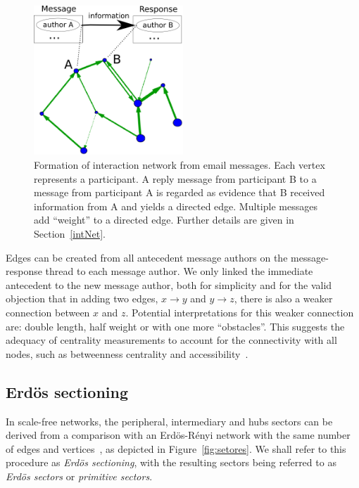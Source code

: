 \documentclass[%
 aip,
 jmp,%
 amsmath,amssymb,
 reprint,%
]{revtex4-1}
\begin{document}
\begin{figure}[!h]
    \centering
    \includegraphics[width=0.5\textwidth]{figs/criaRede_}
    \caption{Formation of interaction network from email messages. Each vertex represents a participant. A reply message from participant B to a message from participant A is regarded as evidence that B received information from A and yields a directed edge. Multiple messages add ``weight'' to a directed edge. Further details are given in Section~\ref{intNet}.}
    \label{formationNetwork}
\end{figure}


Edges can be created from all antecedent message authors on the message-response thread to each message author.
We only linked the immediate antecedent to the new message author, both for simplicity and for the valid objection that in adding two edges, $x\rightarrow y$ and $y\rightarrow z$, there is also a weaker connection between $x$ and $z$. Potential interpretations for this weaker connection are: double length, half weight or with one more ``obstacles''. This suggests the adequacy of centrality measurements to account for the connectivity with all nodes, such as betweenness centrality and accessibility~\cite{luMeasures,access}.

\subsection{Erd\"os sectioning}\label{sectioning}
In scale-free networks, the peripheral, intermediary and hubs sectors can be derived from a comparison with an Erd\"os-R\'enyi network with the same number of edges and vertices~\cite{3setores}, as depicted in Figure~\ref{fig:setores}. We shall refer to this procedure as \emph{Erd\"os sectioning}, with the resulting sectors being referred to as \emph{Erd\"os sectors} or \emph{primitive sectors}.
\end{document}
